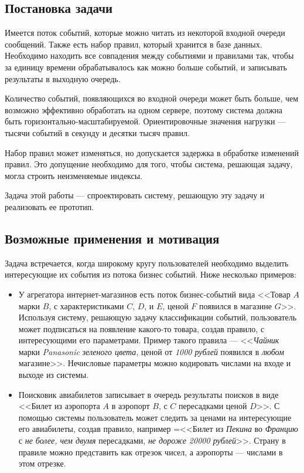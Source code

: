 \documentclass[14pt]{article}
\begin{document}
\subsection{Постановка задачи}
Имеется поток событий, которые можно читать из некоторой входной очереди сообщений. Также есть набор правил, который хранится в базе данных. Необходимо находить все совпадения между событиями и правилами так, чтобы за единицу времени обрабатывалось как можно больше событий, и записывать результаты в выходную очередь.

Количество событий, появляющихся во входной очереди может быть больше, чем возможно эффективно обработать на одном сервере, поэтому система должна быть горизонтально-масштабируемой. Ориентировочные значения нагрузки --- тысячи событий в секунду и десятки тысяч правил.

Набор правил может изменяться, но допускается задержка в обработке изменений правил. Это допущение необходимо для того, чтобы система, решающая задачу, могла строить неизменяемые индексы.

Задача этой работы --- спроектировать систему, решающую эту задачу и реализовать ее прототип.

\subsection{Возможные применения и мотивация}
Задача встречается, когда широкому кругу пользователей необходимо выделить интересующие их события из потока бизнес событий. Ниже несколько примеров:
\begin{itemize}
    \item У агрегатора интернет-магазинов есть поток бизнес-событий вида <<Товар $A$ марки $B$, с характеристиками $C$, $D$, и $E$, ценой $F$ появился в магазине $G$>>. Используя систему, решающую задачу классификации событий, пользователь может подписаться на появление какого-то товара, создав правило, с интересующими его параметрами. Пример такого правила --- <<\emph{Чайник} марки \emph{Panasonic} \emph{зеленого цвета}, ценой от \emph{1000 рублей} появился в \emph{любом} магазине>>. Нечисловые параметры можно кодировать числами на входе и выходе из системы.
    \item Поисковик авиабилетов записывает в очередь результаты поисков в виде <<Билет из аэропорта $A$ в аэропорт $B$, с $C$ пересадками ценой $D$>>. С помощью системы пользователь может следить за ценами на интересующие его авиабилеты, создав правило, например =<<Билет из \emph{Пекина} во \emph{Францию} с \emph{не более, чем двумя} пересадками, \emph{не дороже 20000 рублей}>>. Страну в правиле можно представить как отрезок чисел, а аэропорты --- числами в этом отрезке.
\end{itemize}
\end{document}
